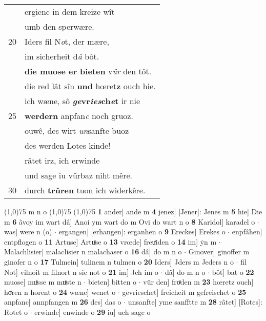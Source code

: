 \documentclass[8pt,a4paper,notitlepage]{article}
\begin{document}
\begin{table}[ht]
\begin{minipage}[t]{0.5\linewidth}
\begin{tabular}{rl}
 & ergienc in dem kreize wît\\ 
 & umb den sperwære.\\ 
20 & Iders fil N\textit{o}t, der mære,\\ 
 & im sicherheit d\textit{â} bôt.\\ 
 & \textbf{die muose er bieten} v\textit{ür} den tôt.\\ 
 & die red lât sîn \textbf{und} hœret\textbf{z} ouch hie.\\ 
 & ich wæne, sô \textbf{\textit{ge}vr\textit{ies}ch\textit{e}t} ir nie\\ 
25 & \textbf{werdern} anpfan\textit{c} noch gruoz.\\ 
 & ouwê, des wirt \textit{un}sanfte buoz\\ 
 & des werden Lotes kinde!\\ 
 & râtet irz, ich erwinde\\ 
 & und sage iu vürbaz niht mêre.\\ 
30 & durch \textbf{trûren} tuon ich widerkêre.\\ 
\end{tabular}
\scriptsize
\line(1,0){75} \newline
m n o \newline
\line(1,0){75} \newline
\newline
\line(1,0){75} \newline
\textbf{1} ander] ande m \textbf{4} jenez] [Jener]: Jenes m \textbf{5} hie] Die m \textbf{6} âvoy im wart dâ] Anoi ym wart do m Ovi do wart n o \textbf{8} Karidol] karadel o  $\cdot$ was] were n (o)  $\cdot$ ergangen] [erhangen]: erganhen o \textbf{9} Ereckes] Erekes o  $\cdot$ enpfâhen] entpflogen o \textbf{11} Artuse] Artuͯse o \textbf{13} vrœde] freuͯiden o \textbf{14} im] ẏn m  $\cdot$ Malachlisier] malaclisier n malachaser o \textbf{16} dâ] do m n o  $\cdot$ Ginover] ginoffer m ginofer n o \textbf{17} Tulmein] tulinem n tulmen o \textbf{20} Iders] Jders m Jeders n o  $\cdot$ fil Not] vilnoit m filnort n sie not o \textbf{21} im] Jch im o  $\cdot$ dâ] do m n o  $\cdot$ bôt] bat o \textbf{22} muose] muͯsse m muͯste n  $\cdot$ bieten] bitten o  $\cdot$ vür den] froͯden m \textbf{23} hœretz ouch] hoͯren n horent o \textbf{24} wæne] wenet o  $\cdot$ gevrieschet] freicheit m gefreischet o \textbf{25} anpfanc] annpfangen m \textbf{26} des] das o  $\cdot$ unsanfte] yme sanfftte m \textbf{28} râtet] [Rotes]: Rotet o  $\cdot$ erwinde] enwinde o \textbf{29} iu] uch sage o \newline
\end{minipage}
\end{table}
\end{document}
